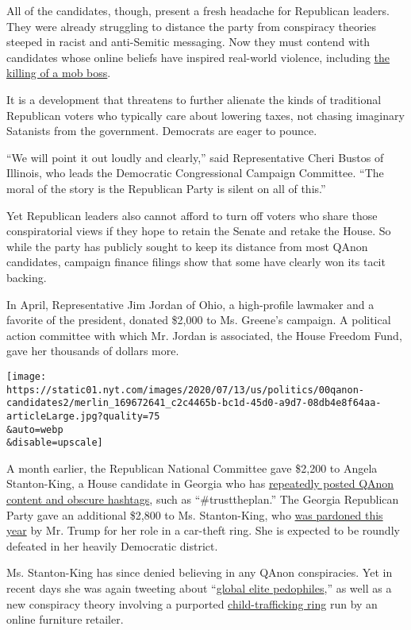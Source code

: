 All of the candidates, though, present a fresh headache for Republican
leaders. They were already struggling to distance the party from
conspiracy theories steeped in racist and anti-Semitic messaging. Now
they must contend with candidates whose online beliefs have inspired
real-world violence, including
\href{https://www.nytimes.com/2019/07/21/nyregion/gambino-shooting-anthony-comello-frank-cali.html}{the
killing of a mob boss}.

It is a development that threatens to further alienate the kinds of
traditional Republican voters who typically care about lowering taxes,
not chasing imaginary Satanists from the government. Democrats are eager
to pounce.

``We will point it out loudly and clearly,'' said Representative Cheri
Bustos of Illinois, who leads the Democratic Congressional Campaign
Committee. ``The moral of the story is the Republican Party is silent on
all of this.''

Yet Republican leaders also cannot afford to turn off voters who share
those conspiratorial views if they hope to retain the Senate and retake
the House. So while the party has publicly sought to keep its distance
from most QAnon candidates, campaign finance filings show that some have
clearly won its tacit backing.

In April, Representative Jim Jordan of Ohio, a high-profile lawmaker and
a favorite of the president, donated \$2,000 to Ms. Greene's campaign. A
political action committee with which Mr. Jordan is associated, the
House Freedom Fund, gave her thousands of dollars more.

\texttt{[image: https://static01.nyt.com/images/2020/07/13/us/politics/00qanon-candidates2/merlin\_169672641\_c2c4465b-bc1d-45d0-a9d7-08db4e8f64aa-articleLarge.jpg?quality=75\\\&auto=webp\\\&disable=upscale]}

A month earlier, the Republican National Committee gave \$2,200 to
Angela Stanton-King, a House candidate in Georgia who has
\href{https://www.instagram.com/tv/B930CqOgc9I/?utm_source=ig_web_copy_link}{repeatedly
posted QAnon content and obscure hashtags}, such as ``\#trusttheplan.''
The Georgia Republican Party gave an additional \$2,800 to Ms.
Stanton-King, who
\href{https://www.nytimes.com/2020/02/18/us/politics/trump-pardons.html}{was
pardoned this year} by Mr. Trump for her role in a car-theft ring. She
is expected to be roundly defeated in her heavily Democratic district.

Ms. Stanton-King has since denied believing in any QAnon conspiracies.
Yet in recent days she was again tweeting about
``\href{https://twitter.com/theangiestanton/status/1281894309093167106?s=20}{global
elite pedophiles},'' as well as a new conspiracy theory involving a
purported
\href{https://twitter.com/theangiestanton/status/1281799576350076930?s=20}{child-trafficking
ring} run by an online furniture retailer.

